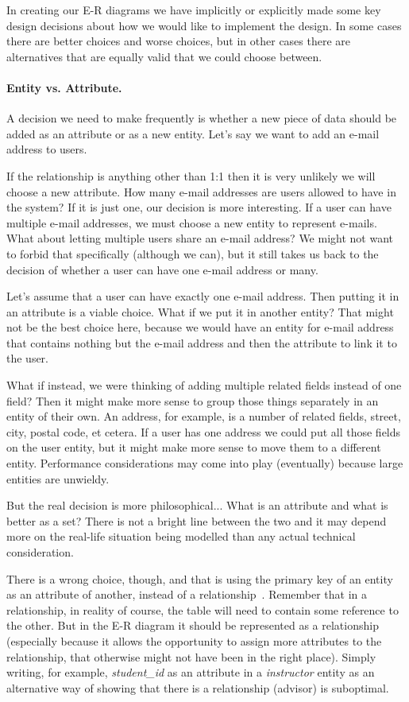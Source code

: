 \documentclass[a4paper]{report}
\begin{document}
In creating our E-R diagrams we have implicitly or explicitly made some key design decisions about how we would like to implement the design. In some cases there are better choices and worse choices, but in other cases there are alternatives that are equally valid that we could choose between.

\paragraph{Entity vs. Attribute.} A decision we need to make frequently is whether a new piece of data should be added as an attribute or as a new entity. Let's say we want to add an e-mail address to users.

If the relationship is anything other than 1:1 then it is very unlikely we will choose a new attribute. How many e-mail addresses are users allowed to have in the system? If it is just one, our decision is more interesting. If a user can have multiple e-mail addresses, we must choose a new entity to represent e-mails. What about letting multiple users share an e-mail address? We might not want to forbid that specifically (although we can), but it still takes us back to the decision of whether a user can have one e-mail address or many.

Let's assume that a user can have exactly one e-mail address. Then putting it in an attribute is a viable choice. What if we put it in another entity? That might not be the best choice here, because we would have an entity for e-mail address that contains nothing but the e-mail address and then the attribute to link it to the user. 

What if instead, we were thinking of adding multiple related fields instead of one field? Then it might make more sense to group those things separately in an entity of their own. An address, for example, is a number of related fields, street, city, postal code, et cetera. If a user has one address we could put all those fields on the user entity, but it might make more sense to move them to a different entity. Performance considerations may come into play (eventually) because large entities are unwieldy. 

But the real decision is more philosophical... What is an attribute and what is better as a set? There is not a bright line between the two and it may depend more on the real-life situation being modelled than any actual technical consideration.

There is a wrong choice, though, and that is using the primary key of an entity as an attribute of another, instead of a relationship~\cite{dsc}. Remember that in a relationship, in reality of course, the table will need to contain some reference to the other. But in the E-R diagram it should be represented as a relationship (especially because it allows the opportunity to assign more attributes to the relationship, that otherwise might not have been in the right place). Simply writing, for example, \textit{student\_id} as an attribute in a \textit{instructor} entity as an alternative way of showing that there is a relationship (advisor) is suboptimal.
\end{document}
